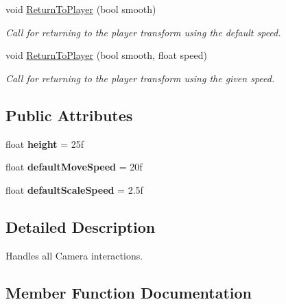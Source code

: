 \begin{DoxyCompactItemize}
void \hyperlink{class_player_camera_a49c0f95881cb45fdcf57647990d9b7c9}{Return\+To\+Player} (bool smooth)
\begin{DoxyCompactList}\small\item\em Call for returning to the player transform using the default speed. \end{DoxyCompactList}\item 
void \hyperlink{class_player_camera_a6dd3d2b6ed065f144db8070ed7f07ba0}{Return\+To\+Player} (bool smooth, float speed)
\begin{DoxyCompactList}\small\item\em Call for returning to the player transform using the given speed. \end{DoxyCompactList}\end{DoxyCompactItemize}
\subsection*{Public Attributes}
\begin{DoxyCompactItemize}
\item 
\hypertarget{class_player_camera_a00b2e5e772f3d02a0f3cbc42728d43f9}{}\label{class_player_camera_a00b2e5e772f3d02a0f3cbc42728d43f9} 
float {\bfseries height} = 25f
\item 
\hypertarget{class_player_camera_a78bf9e6d21438d45b27263baff36f6a0}{}\label{class_player_camera_a78bf9e6d21438d45b27263baff36f6a0} 
float {\bfseries default\+Move\+Speed} = 20f
\item 
\hypertarget{class_player_camera_a8aa51f11e7fc88c5c347ab498d58753c}{}\label{class_player_camera_a8aa51f11e7fc88c5c347ab498d58753c} 
float {\bfseries default\+Scale\+Speed} = 2.\+5f
\end{DoxyCompactItemize}


\subsection{Detailed Description}
Handles all Camera interactions. 



\subsection{Member Function Documentation}
\hypertarget{class_player_camera_a49c0f95881cb45fdcf57647990d9b7c9}{}\label{class_player_camera_a49c0f95881cb45fdcf57647990d9b7c9} 
